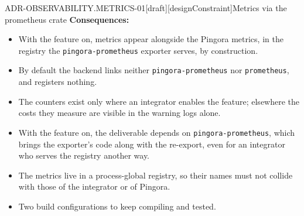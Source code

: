 \begin{requirement}{ADR-OBSERVABILITY.METRICS-01}[draft][designConstraint]{Metrics via the prometheus crate}
  \textbf{Consequences:}
  \begin{itemize}
    \item[+] With the feature on, metrics appear alongside the Pingora
      metrics, in the registry the \texttt{pingora-prometheus} exporter
      serves, by construction.
    \item[+] By default the backend links neither \texttt{pingora-prometheus}
      nor \texttt{prometheus}, and registers nothing.
    \item[--] The counters exist only where an integrator enables the
      feature; elsewhere the costs they measure are visible in the warning
      logs alone.
    \item[--] With the feature on, the deliverable depends on
      \texttt{pingora-prometheus}, which brings the exporter's code along with
      the re-export, even for an integrator who serves the registry another
      way.
    \item[--] The metrics live in a process-global registry, so their names
      must not collide with those of the integrator or of Pingora.
    \item[--] Two build configurations to keep compiling and tested.
  \end{itemize}



\end{requirement}

